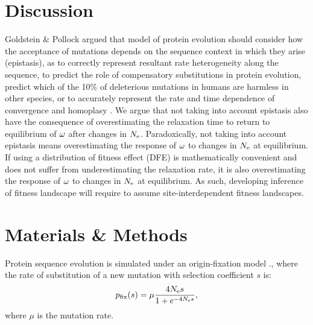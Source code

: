 \documentclass{article}
\begin{document}
\section*{Discussion}
Goldstein \& Pollock argued that model of protein evolution should consider how the acceptance of mutations depends on the sequence context in which they arise (epistasis), as to correctly represent resultant rate heterogeneity along the sequence, to predict the role of compensatory substitutions in protein evolution, predict which of the 10\% of deleterious mutations in humans are harmless in other species, or to accurately represent the rate and time dependence of convergence and homoplasy \cite{Goldstein2017}.
We argue that not taking into account epistasis also have the consequence of overestimating the relaxation time to return to equilibrium of $\omega$ after changes in $N_{\mathrm{e}}$.
Paradoxically, not taking into account epistasis means overestimating the response of $\omega$ to changes in $N_{\mathrm{e}}$ at equilibrium.\\
If using a distribution of fitness effect (DFE) is mathematically convenient and does not suffer from underestimating the relaxation rate, it is also overestimating the response of $\omega$ to changes in $N_{\mathrm{e}}$ at equilibrium.
As such, developing inference of fitness landscape will require to assume site-interdependent fitness landscapes.\\
\section*{Materials \& Methods}
Protein sequence evolution is simulated under an origin-fixation model \cite{McCandlish2014}., where the rate of substitution of a new mutation with selection coefficient $s$ is:
\begin{equation}
p_{\text{fix}}(s) = \mu \dfrac{4 N_{\mathrm{e}} s}{1 + e^{- 4 N_{\mathrm{e}} s }}, 
\end{equation}
where $\mu$ is the mutation rate.
\end{document}
